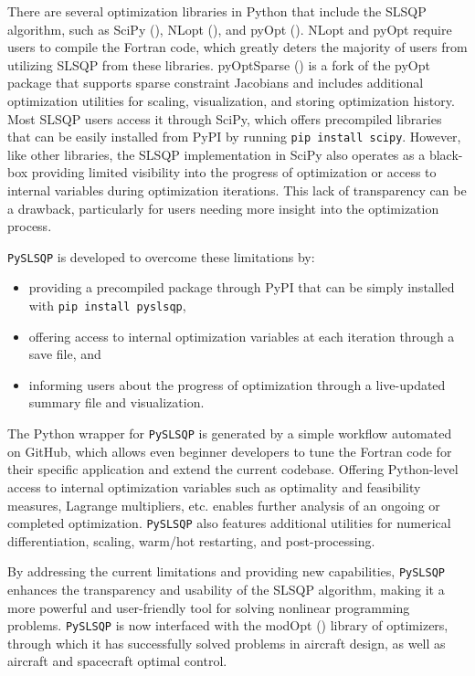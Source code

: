 \documentclass[
]{article}
\begin{document}
There are several optimization libraries in Python that include the
SLSQP algorithm, such as SciPy
(), NLopt
(), and pyOpt
(). NLopt and pyOpt
require users to compile the Fortran code, which greatly deters the
majority of users from utilizing SLSQP from these libraries. pyOptSparse
() is a fork of the
pyOpt package that supports sparse constraint Jacobians and includes
additional optimization utilities for scaling, visualization, and
storing optimization history. Most SLSQP users access it through SciPy,
which offers precompiled libraries that can be easily installed from
PyPI by running \texttt{pip\ install\ scipy}. However, like other
libraries, the SLSQP implementation in SciPy also operates as a
black-box providing limited visibility into the progress of optimization
or access to internal variables during optimization iterations. This
lack of transparency can be a drawback, particularly for users needing
more insight into the optimization process.

\texttt{PySLSQP} is developed to overcome these limitations by:

\begin{itemize}
\item
  providing a precompiled package through PyPI that can be simply
  installed with \texttt{pip\ install\ pyslsqp},
\item
  offering access to internal optimization variables at each iteration
  through a save file, and
\item
  informing users about the progress of optimization through a
  live-updated summary file and visualization.
\end{itemize}

The Python wrapper for \texttt{PySLSQP} is generated by a simple
workflow automated on GitHub, which allows even beginner developers to
tune the Fortran code for their specific application and extend the
current codebase. Offering Python-level access to internal optimization
variables such as optimality and feasibility measures, Lagrange
multipliers, etc. enables further analysis of an ongoing or completed
optimization. \texttt{PySLSQP} also features additional utilities for
numerical differentiation, scaling, warm/hot restarting, and
post-processing.

By addressing the current limitations and providing new capabilities,
\texttt{PySLSQP} enhances the transparency and usability of the SLSQP
algorithm, making it a more powerful and user-friendly tool for solving
nonlinear programming problems. \texttt{PySLSQP} is now interfaced with
the modOpt () library of optimizers,
through which it has successfully solved problems in aircraft design, as
well as aircraft and spacecraft optimal control.
\end{document}
